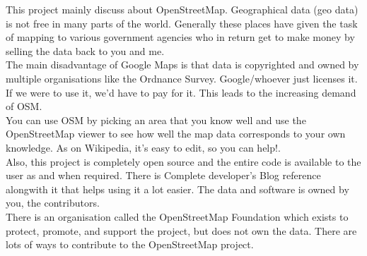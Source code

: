 \begin{Large}
\end{Large}
This project mainly discuss about OpenStreetMap. Geographical data (geo data) is not free in many parts of the world. Generally these places have given the task of mapping to various government agencies who in return get to make money by selling the data back to you and me.\\

The main disadvantage of Google Maps is that data is copyrighted and owned by multiple organisations like the Ordnance Survey. Google/whoever just licenses it. If we were to use it, we'd have to pay for it. This leads to the increasing demand of OSM.\\

You can use OSM by picking an area that you know well and use the OpenStreetMap viewer to see how well the map data corresponds to your own knowledge. As on Wikipedia, it's easy to edit, so you can help!.\\


Also, this project is completely open source and the entire code is available
to the user as and when required. There is Complete developer's
Blog reference alongwith it that helps using it a lot easier. The data and software is owned by you, the contributors.\\

There is an organisation called the OpenStreetMap Foundation which exists to protect, promote, and support the project, but does not own the data. 
There are lots of ways to contribute to the OpenStreetMap project.\\ 

